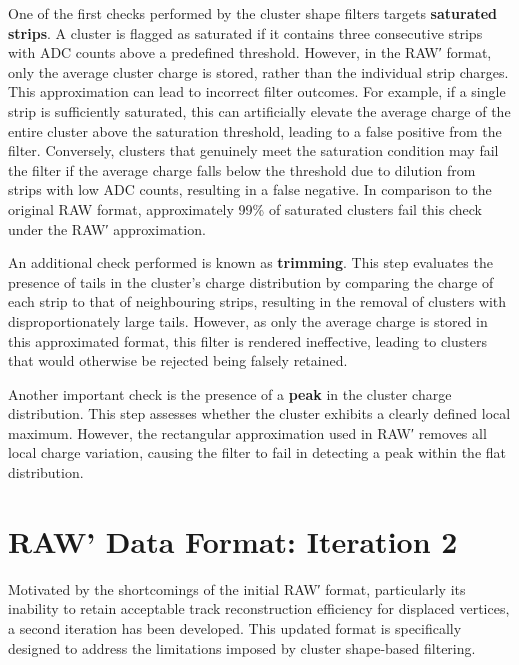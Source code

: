 One of the first checks performed by the cluster shape filters targets \textbf{saturated strips}. A cluster is flagged as saturated if it contains three consecutive strips with ADC counts above a predefined threshold. However, in the RAW′ format, only the average cluster charge is stored, rather than the individual strip charges. This approximation can lead to incorrect filter outcomes. For example, if a single strip is sufficiently saturated, this can artificially elevate the average charge of the entire cluster above the saturation threshold, leading to a false positive from the filter. Conversely, clusters that genuinely meet the saturation condition may fail the filter if the average charge falls below the threshold due to dilution from strips with low ADC counts, resulting in a false negative. In comparison to the original RAW format, approximately 99\% of saturated clusters fail this check under the RAW′ approximation.

An additional check performed is known as \textbf{trimming}. This step evaluates the presence of tails in the cluster's charge distribution by comparing the charge of each strip to that of neighbouring strips, resulting in the removal of clusters with disproportionately large tails. However, as only the average charge is stored in this approximated format, this filter is rendered ineffective, leading to clusters that would otherwise be rejected being falsely retained. 

Another important check is the presence of a \textbf{peak} in the cluster charge distribution. This step assesses whether the cluster exhibits a clearly defined local maximum. However, the rectangular approximation used in RAW′ removes all local charge variation, causing the filter to fail in detecting a peak within the flat distribution.

\section{RAW' Data Format: Iteration 2}

Motivated by the shortcomings of the initial RAW′ format, particularly its inability to retain acceptable track reconstruction efficiency for displaced vertices, a second iteration has been developed. This updated format is specifically designed to address the limitations imposed by cluster shape-based filtering.

